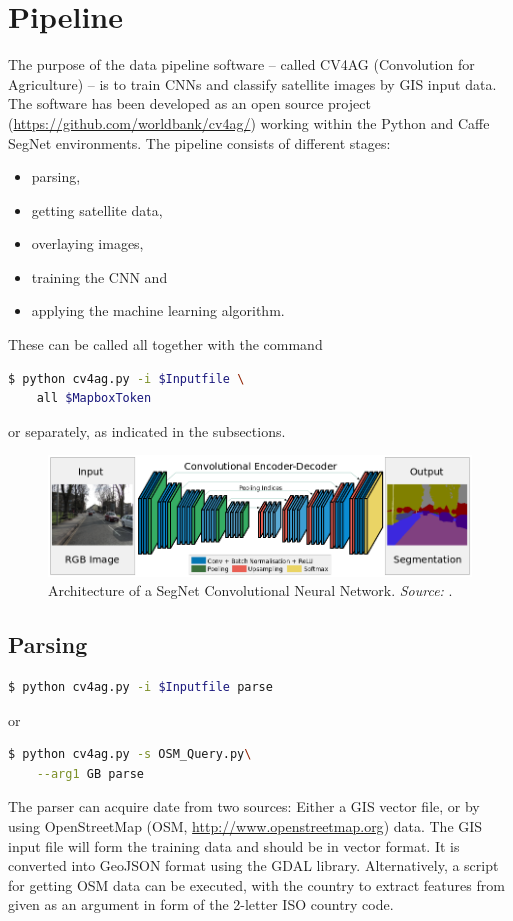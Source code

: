 \documentclass[fleqn,10pt]{SelfArx} %
\begin{document}
\section{Pipeline}
The purpose of the data pipeline software -- called CV4AG (Convolution for Agriculture) -- is to train CNNs and classify satellite images by GIS input data. The software has been developed as an open source project (\url{https://github.com/worldbank/cv4ag/}) working within the Python and Caffe SegNet environments. The pipeline consists of different stages:
\begin{itemize}[noitemsep]
\item  parsing, 
\item getting satellite data,
\item  overlaying images, 
\item training the CNN and 
\item applying the machine learning algorithm.
\end{itemize}
 These can be called all together with the command
\begin{lstlisting}[language=bash]
  $ python cv4ag.py -i $Inputfile \
	all $MapboxToken
\end{lstlisting}

 or separately, as indicated in the subsections.

\begin{figure}[ht]\centering %
\includegraphics[width=\linewidth]{segnet1.png}
\caption{Architecture of a SegNet Convolutional Neural Network. \textit{Source:} \cite{BadrinarayananK15}.}
\label{fig:view}
\end{figure}
\subsection{Parsing}
\begin{lstlisting}[language=bash]
  $ python cv4ag.py -i $Inputfile parse
\end{lstlisting}
or
\begin{lstlisting}[language=bash]
  $ python cv4ag.py -s OSM_Query.py\
	--arg1 GB parse
\end{lstlisting}
The parser can acquire date from two sources: Either a GIS vector file, or by using OpenStreetMap (OSM, \url{http://www.openstreetmap.org}) data.
The GIS input file will form the training data and should be in vector format. It is converted into GeoJSON format using the \textsc{GDAL} library.
Alternatively, a script for getting OSM data can be executed, with the country to extract features from given as an argument in form of the 2-letter ISO country code.
\end{document}

